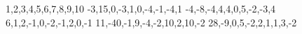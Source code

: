 1,2,3,4,5,6,7,8,9,10
-3,15,0,-3,1,0,-4,-1,-4,1
-4,-8,-4,4,4,0,5,-2,-3,4
6,1,2,-1,0,-2,-1,2,0,-1
11,-40,-1,9,-4,-2,10,2,10,-2
28,-9,0,5,-2,2,1,1,3,-2
